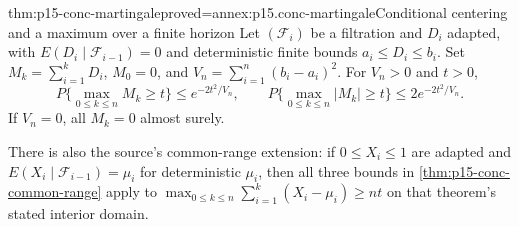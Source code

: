 \begin{hbtheorem}{thm:p15-conc-martingale}{proved=annex:p15.conc-martingale}{Conditional centering and a maximum over a finite horizon}
Let \((\mathcal F_i)\) be a filtration and \(D_i\) adapted,
with \(E(D_i\mid\mathcal F_{i-1})=0\) and deterministic
finite bounds \(a_i\leq D_i\leq b_i\).
Set \(M_k=\sum_{i=1}^kD_i\), \(M_0=0\), and
\(V_n=\sum_{i=1}^n(b_i-a_i)^2\).
For \(V_n>0\) and \(t>0\),
\[
 P\{\max_{0\leq k\leq n}M_k\geq t\}\leq e^{-2t^2/V_n},
 \qquad
 P\{\max_{0\leq k\leq n}|M_k|\geq t\}
                      \leq2e^{-2t^2/V_n}.
\]
If \(V_n=0\), all \(M_k=0\) almost surely.

There is also the source's common-range extension: if
\(0\leq X_i\leq1\) are adapted and
\(E(X_i\mid\mathcal F_{i-1})=\mu_i\) for deterministic
\(\mu_i\), then all three bounds in
\cref{thm:p15-conc-common-range} apply to
\(\max_{0\leq k\leq n}\sum_{i=1}^k(X_i-\mu_i)\geq nt\)
on that theorem's stated interior domain.
\end{hbtheorem}

